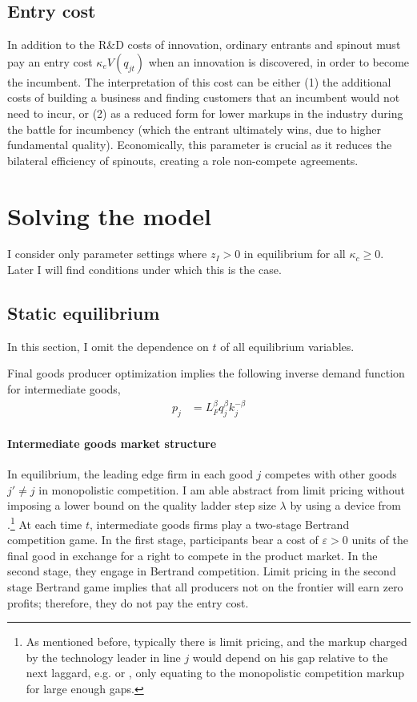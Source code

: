 \documentclass[12pt,english]{article}
\theoremstyle{remark}
\begin{document}
\subsection{Entry cost}

In addition to the R\&D costs of innovation, ordinary entrants and spinout must pay an entry cost $\kappa_{e} V(q_{jt})$ when an innovation is discovered, in order to become the incumbent. The interpretation of this cost can be either (1) the additional costs of building a business and finding customers that an incumbent would not need to incur, or (2) as a reduced form for lower markups in the industry during the battle for incumbency (which the entrant ultimately wins, due to higher fundamental quality). Economically, this parameter is crucial as it reduces the bilateral efficiency of spinouts, creating a role non-compete agreements. 


\section{Solving the model}

I consider only parameter settings where $z_I > 0$ in equilibrium for all $\kappa_c \ge 0$. Later I will find conditions under which this is the case.

\subsection{Static equilibrium}

In this section, I omit the dependence on $t$ of all equilibrium variables. 

Final goods producer optimization implies the following inverse demand function for intermediate goods, 
\begin{align*}
p_j &= L_F^{\beta} q_j^{\beta} k_j^{-\beta}	
\end{align*}

\paragraph{Intermediate goods market structure} In equilibrium, the leading edge firm in each good $j$ competes with other goods $j' \ne j$ in monopolistic competition. I am able abstract from limit pricing without imposing a lower bound on the quality ladder step size $\lambda$ by using a device from \cite{akcigit_growth_2018}.\footnote{As mentioned before, typically there is limit pricing, and the markup charged by the technology leader in line $j$ would depend on his gap relative to the next laggard, e.g. \cite{baslandze_spinout_2019} or \cite{aghion_competition_2005}, only equating to the monopolistic competition markup for large enough gaps.} At each time $t$, intermediate goods firms play a two-stage Bertrand competition game. In the first stage, participants bear a cost of $\varepsilon > 0$ units of the final good in exchange for a right to compete in the product market. In the second stage, they engage in Bertrand competition. Limit pricing in the second stage Bertrand game implies that all producers not on the frontier will earn zero profits; therefore, they do not pay the entry cost. 
\end{document}
